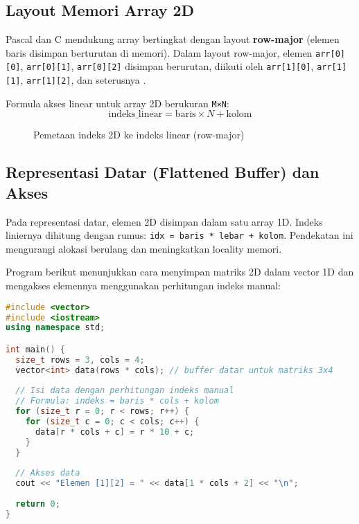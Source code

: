 \documentclass[../main.tex]{subfiles}
\begin{document}
\subsection{Layout Memori Array 2D}

Pascal dan C mendukung array bertingkat dengan layout \textbf{row-major} (elemen baris disimpan berturutan di memori). Dalam layout row-major, elemen \texttt{arr[0][0]}, \texttt{arr[0][1]}, \texttt{arr[0][2]} disimpan berurutan, diikuti oleh \texttt{arr[1][0]}, \texttt{arr[1][1]}, \texttt{arr[1][2]}, dan seterusnya \parencite{free-pascal-docs,cplusplus-multidimensional}.

Formula akses linear untuk array 2D berukuran \texttt{M×N}:
\[
\mathrm{indeks\_linear} = \mathrm{baris} \times N + \mathrm{kolom}
\]

\begin{figure}[H]
  \centering
  \caption{Pemetaan indeks 2D ke indeks linear (row-major)}
  \label{fig:row-major-mapping}
\end{figure}

\subsection{Representasi Datar (Flattened Buffer) dan Akses}
Pada representasi datar, elemen 2D disimpan dalam satu array 1D. Indeks liniernya dihitung dengan rumus: \texttt{idx = baris * lebar + kolom}. Pendekatan ini mengurangi alokasi berulang dan meningkatkan locality memori.

Program berikut menunjukkan cara menyimpan matriks 2D dalam vector 1D dan mengakses elemennya menggunakan perhitungan indeks manual:

\begin{lstlisting}[language=C++, caption={Representasi datar dengan std::vector (C++)}]
#include <vector>
#include <iostream>
using namespace std;

int main() {
  size_t rows = 3, cols = 4;
  vector<int> data(rows * cols); // buffer datar untuk matriks 3x4
  
  // Isi data dengan perhitungan indeks manual
  // Formula: indeks = baris * cols + kolom
  for (size_t r = 0; r < rows; r++) {
    for (size_t c = 0; c < cols; c++) {
      data[r * cols + c] = r * 10 + c;
    }
  }
  
  // Akses data
  cout << "Elemen [1][2] = " << data[1 * cols + 2] << "\n";
  
  return 0;
}
\end{lstlisting}
\end{document}
